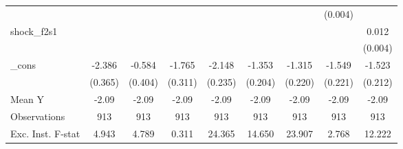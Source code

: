 {\begin{tabular}{l*{8}{c}}
            &                     &                     &                     &                     &                     &                     &     (0.004)         &                     \\
\addlinespace
shock\_f2s1  &                     &                     &                     &                     &                     &                     &                     &       0.012\sym{***}\\
            &                     &                     &                     &                     &                     &                     &                     &     (0.004)         \\
\addlinespace
\_cons      &      -2.386\sym{***}&      -0.584         &      -1.765\sym{***}&      -2.148\sym{***}&      -1.353\sym{***}&      -1.315\sym{***}&      -1.549\sym{***}&      -1.523\sym{***}\\
            &     (0.365)         &     (0.404)         &     (0.311)         &     (0.235)         &     (0.204)         &     (0.220)         &     (0.221)         &     (0.212)         \\
\midrule
Mean Y      &       -2.09         &       -2.09         &       -2.09         &       -2.09         &       -2.09         &       -2.09         &       -2.09         &       -2.09         \\
Observations&         913         &         913         &         913         &         913         &         913         &         913         &         913         &         913         \\
Exc. Inst. F-stat&       4.943         &       4.789         &       0.311         &      24.365         &      14.650         &      23.907         &       2.768         &      12.222         \\
\bottomrule
\end{tabular}
}
